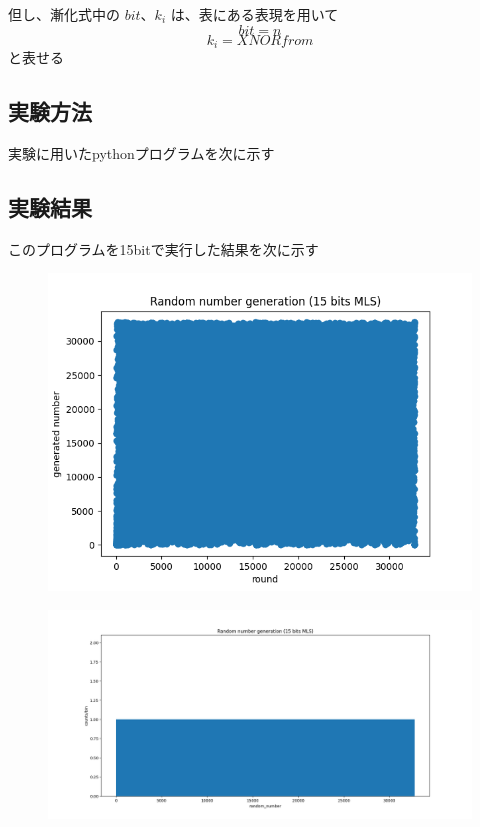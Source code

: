 \documentclass[xelatex,ja=standard]{bxjsarticle}
\begin{document}
但し、漸化式中の $bit$、$k_i$ は、表にある表現を用いて
\[
bit = n
\]
\[
k_i = {XNOR from}
\]
と表せる


\subsection{実験方法}

実験に用いたpythonプログラムを次に示す


\subsection{実験結果}

このプログラムを15bitで実行した結果を次に示す

\begin{figure}[htbp]
    \centering
    \includegraphics[scale=0.7]
{2.png}
    \label{fig:1}
\end{figure}

\begin{figure}[htbp]
    \centering
    \includegraphics[scale=0.3]
{3.png}
    \label{fig:1}
\end{figure}
\end{document}
